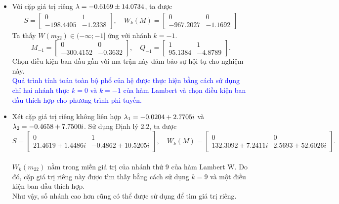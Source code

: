 \documentclass[10pt]{beamer}
\begin{document}
\scriptsize{
	\begin{frame}
		\begin{itemize}
			\item 
			Với cặp giá trị riêng $\lambda = -0.6169 \pm 14.0734$, ta được
			\begin{align*}\label{eq40}
				S=\begin{bmatrix}
					0 & 1 \\ -198.4405 & -1.2338
				\end{bmatrix}, \quad	 W_k(M) =\begin{bmatrix}
					0 & 0 \\ -967.2027 & -1.1692
				\end{bmatrix}
			\end{align*} 
			Ta thấy $W(m_{22}) \in (-\infty; -1]$ ứng với nhánh $k = -1$. 
			\begin{equation*}
				M_{-1}= \begin{bmatrix}
					0 & 0 \\   -300.4152  &-0.3632
				\end{bmatrix}, \quad
				Q_{-1}	= \begin{bmatrix}
					1&1\\95.1384 & -4.8789
				\end{bmatrix}.
			\end{equation*}
			Chọn điều kiện ban đầu gần với ma trận này đảm bảo sự hội tụ cho nghiệm này.\\
			\vskip 0.2cm
			\textcolor{blue}{Quá trình tính toán toàn bộ phổ của hệ được thực hiện bằng cách sử dụng chỉ hai nhánh thực $k =0$ và $k =-1$ của hàm Lambert và chọn điều kiện ban đầu thích hợp cho phương trình phi tuyến.}
			\vskip 0.2cm
			\item
			Xét cặp giá trị riêng không liên hợp $\lambda_1=-0.0204 + 2.7705i$ và $\lambda_2 = -0.4658 + 7.7500i$. Sử dụng Định lý 2.2, ta được
			\begin{equation*}
				S= \left[ \begin{smallmatrix}
					0 & 1\\   21.4619 + 1.4486i & -0.4862 +10.5205i
				\end{smallmatrix}
			     \right] , \quad
				W_k(M)= 
				\left[
				\begin{smallmatrix}
					0 & 0\\   132.3092 + 7.2411i &  2.5693 + 52.6026i	
				\end{smallmatrix}
			     \right] .
			\end{equation*}\\
			$W_k(m_{22})$ nằm trong miền giá trị của nhánh thứ $9$ của hàm Lambert W. Do đó, cặp giá trị riêng này được tìm thấy bằng cách sử dụng $k = 9$ và một điều kiện ban đầu thích hợp.\\ {\color{blue} Như vậy, số nhánh cao hơn cũng có thể được sử dụng để tìm giá trị riêng.}			
		\end{itemize}
	\end{frame}
}
\end{document}
